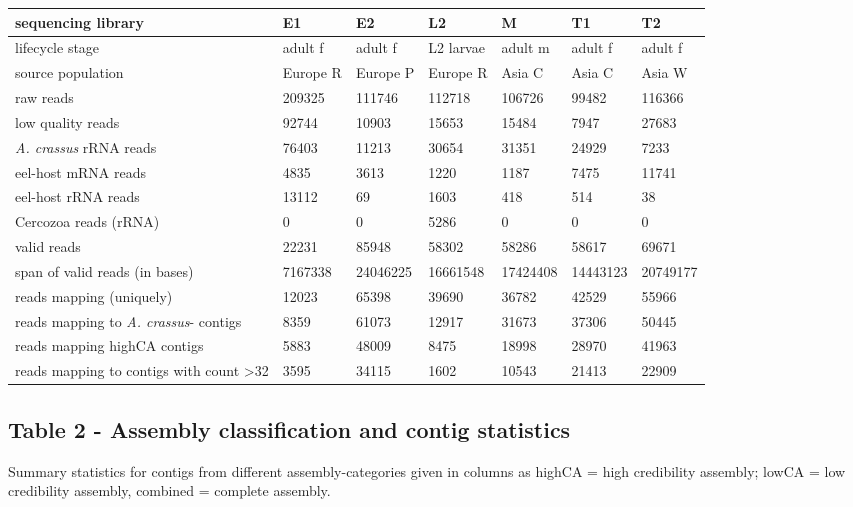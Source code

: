 \documentclass[10pt]{bmc_article}
\newenvironment{bmcformat}{\begin{raggedright}\baselineskip20pt\sloppy\setboolean{publ}{false}}{\end{raggedright}\baselineskip20pt\sloppy}
\begin{document}
\begin{bmcformat}
\begin{tabular}{p{4.5cm}llllll}
   \hline
sequencing library & E1 & E2 & L2 & M & T1 & T2 \\ 
   \hline
lifecycle stage & adult f & adult f & L2 larvae & adult m & adult f & adult f \\ 
  source population & Europe R & Europe P & Europe R & Asia C & Asia C & Asia W \\ 
  raw reads & 209325 & 111746 & 112718 & 106726 & 99482 & 116366 \\ 
  low quality reads & 92744 & 10903 & 15653 & 15484 & 7947 & 27683 \\ 
  \textit{A. crassus} rRNA reads & 76403 & 11213 & 30654 & 31351 & 24929 & 7233 \\ 
  eel-host mRNA reads & 4835 & 3613 & 1220 & 1187 & 7475 & 11741 \\ 
  eel-host rRNA reads & 13112 & 69 & 1603 & 418 & 514 & 38 \\ 
  Cercozoa reads (rRNA) & 0 & 0 & 5286 & 0 & 0 & 0 \\ 
  valid reads & 22231 & 85948 & 58302 & 58286 & 58617 & 69671 \\ 
  span of valid reads (in bases) & 7167338 & 24046225 & 16661548 & 17424408 & 14443123 & 20749177 \\ 
  reads mapping (uniquely) & 12023 & 65398 & 39690 & 36782 & 42529 & 55966 \\ 
  reads mapping to \textit{A. crassus}- contigs &  8359 & 61073 & 12917 & 31673 & 37306 & 50445 \\ 
  reads mapping highCA contigs &  5883 & 48009 &  8475 & 18998 & 28970 & 41963 \\ 
  reads mapping to contigs with count >32 &  3595 & 34115 &  1602 & 10543 & 21413 & 22909 \\ 
   \hline
\end{tabular}
\subsection*{Table 2 - Assembly classification and contig statistics}

Summary statistics for contigs from different assembly-categories
given in columns as highCA = high credibility assembly; lowCA = low
credibility assembly, combined = complete assembly.


\end{bmcformat}
\end{document}
